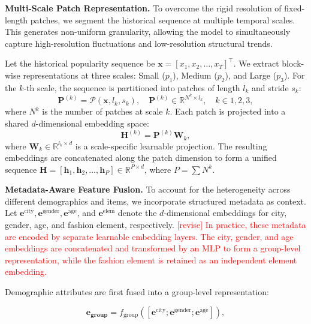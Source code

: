 \documentclass[Afour,sageh,times]{sagej}
\newcommand{\zhang}[1]{\textcolor{red}{[revise] #1}}
\begin{document}
{\textbf{Multi-Scale Patch Representation.} To overcome the rigid resolution of fixed-length patches, we segment the historical sequence at multiple temporal scales. This generates non-uniform granularity, allowing the model to simultaneously capture high-resolution fluctuations and low-resolution structural trends.

Let the historical popularity sequence be $\mathbf{x} = [x_1, x_2, \dots, x_T]^\top$. We extract block-wise representations at three scales: Small ($p_1$), Medium ($p_2$), and Large ($p_3$). For the $k$-th scale, the sequence is partitioned into patches of length $l_k$ and stride $s_k$:
\begin{equation}
\mathbf{P}^{(k)} = \mathcal{P}(\mathbf{x}, l_k, s_k), \quad \mathbf{P}^{(k)} \in \mathbb{R}^{N^k \times l_k}, \quad k \in {1, 2, 3},
\end{equation}
where $N^k$ is the number of patches at scale $k$. Each patch is projected into a shared $d$-dimensional embedding space:
\begin{equation}
\mathbf{H}^{(k)} = \mathbf{P}^{(k)} \mathbf{W}_k,
\end{equation}
where $\mathbf{W}_k \in \mathbb{R}^{l_k \times d}$ is a scale-specific learnable projection. The resulting embeddings are concatenated along the patch dimension to form a unified sequence $\mathbf{H} = [\mathbf{h}_1, \mathbf{h}_2, \dots, \mathbf{h}_P] \in \mathbb{R}^{P \times d}$, where $P = \sum N^k$.

\textbf{Metadata-Aware Feature Fusion.} To account for the heterogeneity across different demographics and items, we incorporate structured metadata as context. Let $\mathbf{e}^{\text{city}}, \mathbf{e}^{\text{gender}}, \mathbf{e}^{\text{age}}$, and $\mathbf{e}^{\text{elem}}$ denote the $d$-dimensional embeddings for city, gender, age, and fashion element, respectively. 
\zhang{In practice, these metadata are encoded by separate learnable embedding layers. The city, gender, and age embeddings are concatenated and transformed by an MLP to form a group-level representation, while the fashion element is retained as an independent element embedding.}


Demographic attributes are first fused into a group-level representation:

\begin{equation}
\mathbf{e_\text{group}} = f_\text{group}([\mathbf{e}^{\text{city}}; 
\mathbf{e}^{\text{gender}}; \mathbf{e}^{\text{age}}]),
\end{equation}

}
\end{document}
